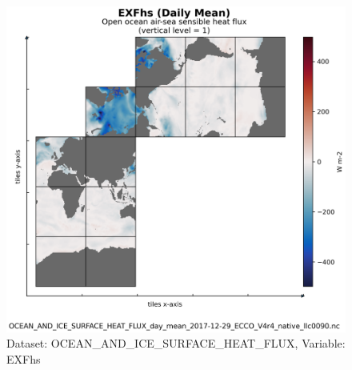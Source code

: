 \begin{figure}[H]
\centering
\includegraphics[scale=0.55]{../images/plots/native_plots/Ocean_and_Sea-Ice_Surface_Heat_Fluxes/EXFhs.png}
\caption{Dataset: OCEAN\_AND\_ICE\_SURFACE\_HEAT\_FLUX, Variable: EXFhs}
\label{tab:table-OCEAN_AND_ICE_SURFACE_HEAT_FLUX_EXFhs-Plot}
\end{figure}
\newpage
\pagebreak

